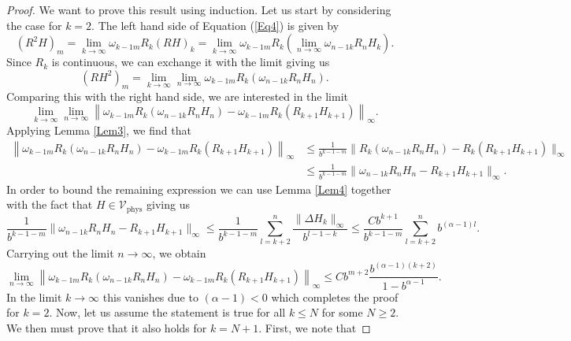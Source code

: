 \documentclass{article}
\newcommand{\phys}{\mathrm{phys}}
\begin{document}
\begin{proof}
    We want to prove this result using induction. Let us start by considering the case for $k=2$. The left hand side of Equation (\ref{Eq4}) is given by
    \begin{equation}
        (R^2H)_m=\lim_{k\to\infty}\omega_{k-1m}R_k(RH)_k=\lim_{k\to\infty}\omega_{k-1m}R_k(\lim_{n\to\infty}\omega_{n-1k}R_nH_k).
    \end{equation}
    Since $R_k$ is continuous, we can exchange it with the limit giving us
    \begin{equation}
        (RH^2)_m=\lim_{k\to\infty}\lim_{n\to\infty}\omega_{k-1m}R_k(\omega_{n-1k}R_nH_n).
    \end{equation}
    Comparing this with the right hand side, we are interested in the limit
    \begin{equation}
        \lim_{k\to\infty}\lim_{n\to\infty}\left\|\omega_{k-1m}R_k(\omega_{n-1k}R_nH_n)-\omega_{k-1m}R_k(R_{k+1}H_{k+1})\right\|_\infty.
    \end{equation}
    Applying Lemma \ref{Lem3}, we find that
    \begin{align}
        \left\|\omega_{k-1m}R_k(\omega_{n-1k}R_nH_n)-\omega_{k-1m}R_k(R_{k+1}H_{k+1})\right\|_\infty&\leq\frac{1}{b^{k-1-m}}\|R_k(\omega_{n-1k}R_nH_n)-R_k(R_{k+1}H_{k+1})\|_\infty\nonumber\\
        &\leq\frac{1}{b^{k-1-m}}\|\omega_{n-1k}R_nH_n-R_{k+1}H_{k+1}\|_\infty.
    \end{align}
    In order to bound the remaining expression we can use Lemma \ref{Lem4} together with the fact that $H\in\mathcal{V}_\phys$ giving us
    \begin{equation}
        \frac{1}{b^{k-1-m}}\|\omega_{n-1k}R_nH_n-R_{k+1}H_{k+1}\|_\infty\leq\frac{1}{b^{k-1-m}}\sum_{l=k+2}^n\frac{\|\Delta H_k\|_\infty}{b^{l-1-k}}\leq\frac{Cb^{k+1}}{b^{k-1-m}}\sum_{l=k+2}^nb^{(\alpha-1)l}.
    \end{equation}
    Carrying out the limit $n\to\infty$, we obtain
    \begin{equation}
        \lim_{n\to\infty}\left\|\omega_{k-1m}R_k(\omega_{n-1k}R_nH_n)-\omega_{k-1m}R_k(R_{k+1}H_{k+1})\right\|_\infty\leq Cb^{m+2}\frac{b^{(\alpha-1)(k+2)}}{1-b^{\alpha-1}}.
    \end{equation}
    In the limit $k\to\infty$ this vanishes due to $(\alpha-1)<0$ which completes the proof for $k=2$. Now, let us assume the statement is true for all $k\leq N$ for some $N\geq 2$. We then must prove that it also holds for $k=N+1$. First, we note that

\end{proof}
\end{document}

